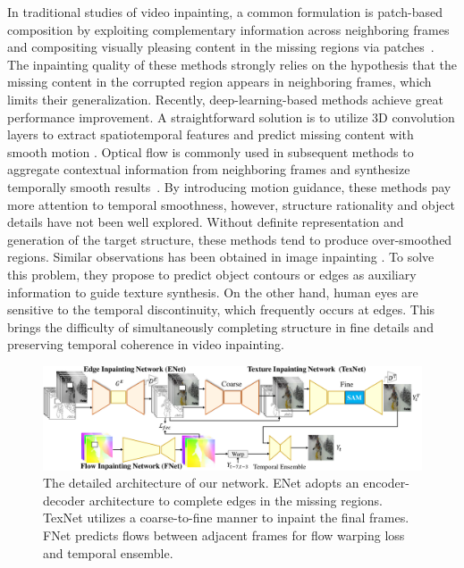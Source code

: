 In traditional studies of video inpainting, a common formulation is patch-based composition by exploiting complementary information across neighboring frames and compositing visually pleasing content in the missing regions via patches~\cite{patwardhan2007video,wexler2004space,newson2014video}.
% 
The inpainting quality of these methods strongly relies on the hypothesis that the missing content in the corrupted region appears in neighboring frames, which limits their generalization.
%
Recently, deep-learning-based methods achieve great performance improvement.
A straightforward solution is to utilize 3D convolution layers to extract spatiotemporal features and predict missing content with smooth motion \cite{wang2019video}.
Optical flow is commonly used in subsequent methods to aggregate contextual information from neighboring frames and synthesize temporally smooth results~\cite{Xu_2019_CVPR,Kim_2019_CVPR,Kim_2019_CVPR1}.
%
By introducing motion guidance, these methods pay more attention to temporal smoothness, however, structure rationality and object details have not been well explored. 
%
Without definite representation and generation of the target structure, these methods tend to produce over-smoothed regions. 
Similar observations has been obtained in image inpainting \cite{Xiong_2019_CVPR,nazeri2019edgeconnect}. %
To solve this problem, they propose to predict object contours or edges as auxiliary information to guide texture synthesis.
%
On the other hand, human eyes are sensitive to the temporal discontinuity, which frequently occurs at edges. 
This brings the difficulty of simultaneously completing structure in fine details and preserving temporal coherence in video inpainting.

\begin{figure}[ht]
	\centering
	\includegraphics[width=2.0\columnwidth]{sti} %
	\caption{The detailed architecture of our network. ENet adopts an encoder-decoder architecture to complete edges in the missing regions. TexNet utilizes a coarse-to-fine manner to inpaint the final frames. FNet predicts flows between adjacent frames for flow warping loss and temporal ensemble. }
	
	\label{fig:stiNet}
\end{figure}

